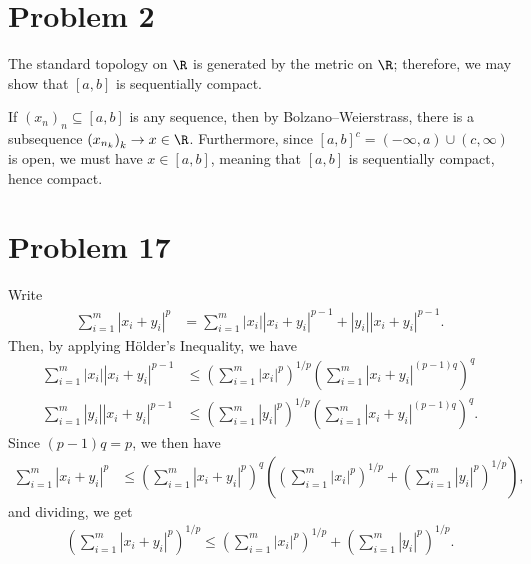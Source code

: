 \documentclass[10pt]{mypackage}
\begin{document}
\RaggedRight
\section{Problem 2}%
The standard topology on $\R$ is generated by the metric on $\R$; therefore, we may show that $\left[ a,b \right]$ is sequentially compact.\newline

If $\left( x_n \right)_{n}\subseteq [a,b]$ is any sequence, then by Bolzano--Weierstrass, there is a subsequence $\left( x_{n_k} \right)_k \rightarrow x\in \R$. Furthermore, since $\left[ a,b \right]^{c} = \left( -\infty,a \right)\cup \left( c,\infty \right)$ is open, we must have $x\in [a,b]$, meaning that $\left[ a,b \right]$ is sequentially compact, hence compact.
\section{Problem 17}%
Write
\begin{align*}
  \sum_{i=1}^{m} \left\vert x_i + y_i \right\vert^{p} &= \sum_{i=1}^{m} \left\vert x_i \right\vert\left\vert x_i + y_i \right\vert^{p-1} + \left\vert y_i \right\vert\left\vert x_i + y_i \right\vert^{p-1}.
\end{align*}
Then, by applying Hölder's Inequality, we have
\begin{align*}
  \sum_{i=1}^{m} \left\vert x_i \right\vert\left\vert x_i + y_i \right\vert^{p-1} &\leq \left( \sum_{i=1}^{m} \left\vert x_i \right\vert^{p} \right)^{1/p}\left( \sum_{i=1}^{m} \left\vert x_i + y_i \right\vert^{\left( p-1 \right)q} \right)^{q}\\
  \sum_{i=1}^{m} \left\vert y_i \right\vert\left\vert x_i + y_i \right\vert^{p-1} &\leq \left( \sum_{i=1}^{m} \left\vert y_i \right\vert^{p} \right)^{1/p}\left( \sum_{i=1}^{m} \left\vert x_i + y_i \right\vert^{\left( p-1 \right)q} \right)^{q}.
\end{align*}
Since $\left( p-1 \right)q = p$, we then have
\begin{align*}
  \sum_{i=1}^{m} \left\vert x_i + y_i \right\vert^{p} &\leq \left( \sum_{i=1}^{m}\left\vert x_i + y_i \right\vert^{p} \right)^{q} \left( \left( \sum_{i=1}^{m}\left\vert x_i \right\vert^{p} \right)^{1/p} + \left( \sum_{i=1}^{m} \left\vert y_i \right\vert^{p} \right)^{1/p} \right),
\end{align*}
and dividing, we get
\begin{align*}
  \left( \sum_{i=1}^{m}\left\vert x_i + y_i \right\vert^{p} \right)^{1/p} \leq \left( \sum_{i=1}^{m}\left\vert x_i \right\vert^{p} \right)^{1/p} + \left( \sum_{i=1}^{m}\left\vert y_i \right\vert^{p} \right)^{1/p}.
\end{align*}
\end{document}
